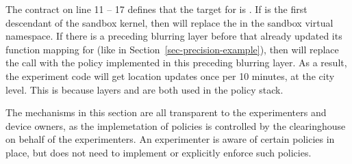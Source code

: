 The contract on line 11 -- 17 defines that the target
for  is . If 
 is the first descendant of the sandbox kernel, then
 will replace the 
in the sandbox virtual namespace. If there is a preceding blurring layer 
before  that already updated its 
function mapping for  (like   
in Section~\ref{sec-precision-example}), then
 will replace the  call
with the policy implemented in this preceding blurring layer. As a result, 
the experiment code will get location updates once per 10 minutes, at
the city level. This is because layers  and 
 are both used in the policy stack.

\bigskip
The mechanisms in this section are all transparent to the experimenters 
and device owners, as the implemetation of policies is controlled by the 
clearinghouse on behalf of the experimenters. An experimenter is aware 
of certain policies in place, but does not need to implement or explicitly
enforce such policies. 